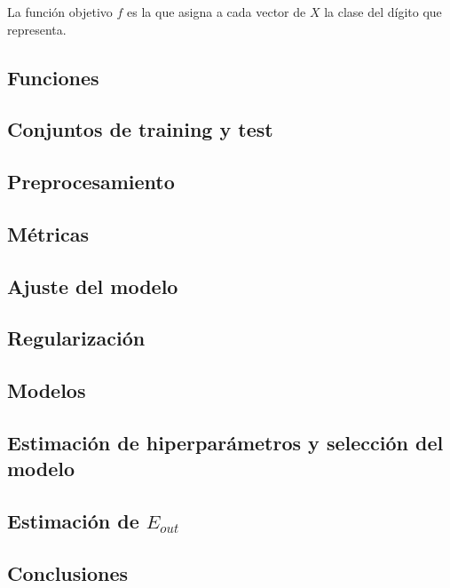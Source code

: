 \documentclass[a4]{article}
\begin{document}
La función objetivo $f$ es la que asigna a cada vector de $X$ la clase
del dígito que representa.

\subsection{Funciones} %

\subsection{Conjuntos de training y test}

\subsection{Preprocesamiento}

\subsection{Métricas}

\subsection{Ajuste del modelo}

\subsection{Regularización}

\subsection{Modelos}

\subsection{Estimación de hiperparámetros y selección del modelo}

\subsection{Estimación de $E_{out}$}

\subsection{Conclusiones}
\end{document}
